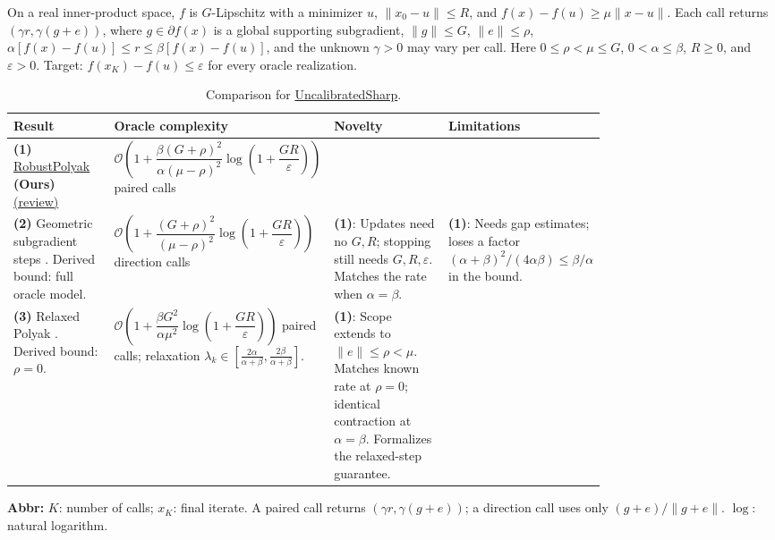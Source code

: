 \begin{table}[tp]
\centering
\caption{Comparison for \href{https://github.com/k3nfalt/longtails/blob/main/LongTails/Setups/UncalibratedSharp.lean}{UncalibratedSharp}.}\label{tab:UncalibratedSharp}
\parbox{\linewidth}{\footnotesize On a real inner-product space, $f$ is $G$-Lipschitz with a minimizer $u$, $\|x_0-u\|\le R$, and $f(x)-f(u)\ge\mu\|x-u\|$. Each call returns $(\gamma r,\gamma(g+e))$, where $g\in\partial f(x)$ is a global supporting subgradient, $\|g\|\le G$, $\|e\|\le\rho$, $\alpha[f(x)-f(u)]\le r\le\beta[f(x)-f(u)]$, and the unknown $\gamma>0$ may vary per call. Here $0\le\rho<\mu\le G$, $0<\alpha\le\beta$, $R\ge0$, and $\varepsilon>0$. Target: $f(x_K)-f(u)\le\varepsilon$ for every oracle realization.}\par\smallskip
\begin{threeparttable}
\footnotesize
\setlength{\tabcolsep}{4pt}\renewcommand{\arraystretch}{1.25}
\begin{tabularx}{\linewidth}{@{}>{\raggedright\arraybackslash}p{0.20\linewidth}>{\raggedright\arraybackslash}p{0.32\linewidth}>{\raggedright\arraybackslash}p{0.25\linewidth}>{\raggedright\arraybackslash}X@{}}
\toprule
\textbf{Result} & \textbf{Oracle complexity} & \textbf{Novelty} & \textbf{Limitations} \\
\midrule
\textbf{(1)} \href{https://github.com/k3nfalt/longtails/blob/main/LongTails/Theorems/RobustPolyak.lean}{Robust\allowbreak Polyak} \textbf{(Ours)} \href{https://github.com/k3nfalt/longtails/blob/main/scripts/reviews/RobustPolyak.md}{(review)}
& $\mathcal{O}\!\left(1+\dfrac{\beta(G+\rho)^2}{\alpha(\mu-\rho)^2}\log\!\left(1+\dfrac{GR}{\varepsilon}\right)\right)$ paired calls
& & \\
\midrule[1.2pt]
\textbf{(2)} Geometric subgradient steps \citep[\S5]{uncalSharpDavis2018}. Derived bound: full oracle model.
& $\mathcal{O}\!\left(1+\dfrac{(G+\rho)^2}{(\mu-\rho)^2}\log\!\left(1+\dfrac{GR}{\varepsilon}\right)\right)$ direction calls
& \textbf{(1)}: Updates need no $G,R$; stopping still needs $G,R,\varepsilon$. Matches the rate when $\alpha=\beta$.
& \textbf{(1)}: Needs gap estimates; loses a factor $(\alpha+\beta)^2/(4\alpha\beta)\le\beta/\alpha$ in the bound. \\
\midrule
\textbf{(3)} Relaxed Polyak \citep[\S3]{uncalSharpDavis2018}. Derived bound: $\rho=0$.
& $\mathcal{O}\!\left(1+\dfrac{\beta G^2}{\alpha\mu^2}\log\!\left(1+\dfrac{GR}{\varepsilon}\right)\right)$ paired calls; relaxation $\lambda_k\in[\frac{2\alpha}{\alpha+\beta},\frac{2\beta}{\alpha+\beta}]$.
& \textbf{(1)}: Scope extends to $\|e\|\le\rho<\mu$. Matches known rate at $\rho=0$; identical contraction at $\alpha=\beta$. Formalizes the relaxed-step guarantee.
& \\
\bottomrule
\end{tabularx}
\begin{tablenotes}[flushleft]\footnotesize
\item[] \textbf{Abbr:} $K$: number of calls; $x_K$: final iterate. A paired call returns $(\gamma r,\gamma(g+e))$; a direction call uses only $(g+e)/\|g+e\|$. $\log$: natural logarithm.
\end{tablenotes}
\end{threeparttable}
\end{table}
